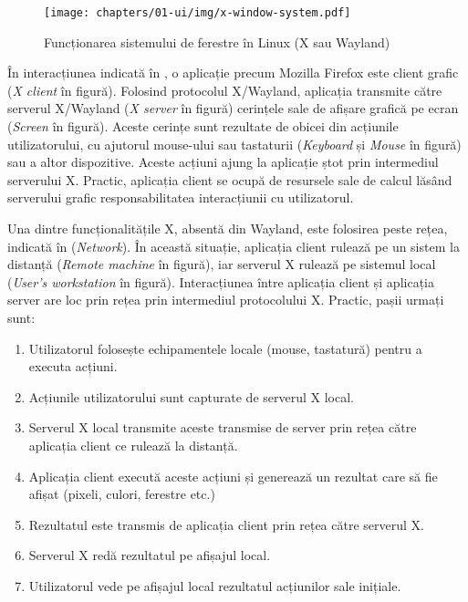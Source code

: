 \begin{figure}[htbp]
  \centering
  \texttt{[image: chapters/01-ui/img/x-window-system.pdf]}
  \caption{Funcționarea sistemului de ferestre în Linux (X sau Wayland)}
  \label{fig:ui:x-window-system}
\end{figure}

În interacțiunea indicată în , o aplicație precum Mozilla Firefox este client grafic (\textit{X client} în figură).
Folosind protocolul X/Wayland, aplicația transmite către serverul X/Wayland (\textit{X server} în figură) cerințele sale de afișare grafică pe ecran (\textit{Screen} în figură).
Aceste cerințe sunt rezultate de obicei din acțiunile utilizatorului, cu ajutorul mouse-ului sau tastaturii (\textit{Keyboard} și \textit{Mouse} în figură) sau a altor dispozitive.
Aceste acțiuni ajung la aplicație ștot prin intermediul serverului X.
Practic, aplicația client se ocupă de resursele sale de calcul lăsând serverului grafic responsabilitatea interacțiunii cu utilizatorul.

Una dintre funcționalitățile X, absentă din Wayland, este folosirea peste rețea, indicată în  (\textit{Network}).
În această situație, aplicația client rulează pe un sistem la distanță (\textit{Remote machine} în figură), iar serverul X rulează pe sistemul local (\textit{User's workstation} în figură).
Interacțiunea între aplicația client și aplicația server are loc prin rețea prin intermediul protocolului X.
Practic, pașii urmați sunt:

\begin{enumerate}
  \item Utilizatorul folosește echipamentele locale (mouse, tastatură) pentru a executa acțiuni.
  \item Acțiunile utilizatorului sunt capturate de serverul X local.
  \item Serverul X local transmite aceste transmise de server prin rețea către aplicația client ce rulează la distanță.
  \item Aplicația client execută aceste acțiuni și generează un rezultat care să fie afișat (pixeli, culori, ferestre etc.)
  \item Rezultatul este transmis de aplicația client prin rețea către serverul X.
  \item Serverul X redă rezultatul pe afișajul local.
  \item Utilizatorul vede pe afișajul local rezultatul acțiunilor sale inițiale.
\end{enumerate}

